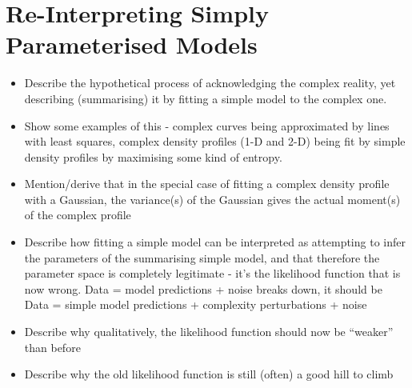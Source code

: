 \documentclass[letterpaper, 11pt]{article}
\begin{document}
\section{Re-Interpreting Simply Parameterised Models}

\begin{itemize}
\item Describe the hypothetical process of acknowledging the complex reality, yet describing (summarising) it by fitting a simple model to the complex one. \\
\item Show some examples of this - complex curves being approximated by lines with least squares, complex density profiles (1-D and 2-D) being fit by simple density profiles by maximising some kind of entropy.
\item Mention/derive that in the special case of fitting a complex density profile with a Gaussian, the variance(s) of the Gaussian gives the actual moment(s) of the complex profile
\item Describe how fitting a simple model can be interpreted as attempting to infer the parameters of the summarising simple model, and that therefore the parameter space is completely legitimate - it's the likelihood function that is now wrong. Data = model predictions + noise breaks down, it should be Data = simple model predictions + complexity perturbations + noise
\item Describe why qualitatively, the likelihood function should now be ``weaker'' than before
\item Describe why the old likelihood function is still (often) a good hill to climb
\end{itemize}
\end{document}
